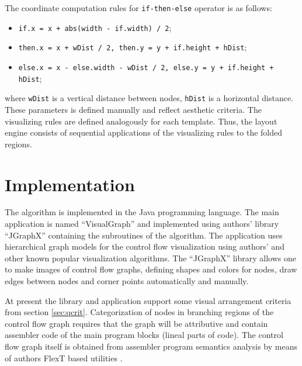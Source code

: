 \documentclass[conference]{IEEEtran}
\begin{document}
The coordinate computation rules for \texttt{if-then-else} operator is as follows:
\begin{itemize}
\item [] \texttt{if.x = x + abs(width - if.width) / 2};
\item [] \texttt{then.x = x  + wDist / 2, then.y = y + if.height + hDist};
\item [] \texttt{else.x = x - else.width - wDist / 2, else.y = y + if.height + hDist};
\end{itemize}
where \texttt{wDist} is a vertical distance between nodes, \texttt{hDist} is a horizontal distance.  These parameters is defined manually and reflect aesthetic criteria.  The visualizing rules are defined analogously for each template.  Thus, the layout engine consists of sequential applications of the visualizing rules to the folded regions.

\section{Implementation}
\label{sec:implementation}

The algorithm is implemented in the Java programming language.  The main application is named ``VisualGraph'' and implemented using authors' library ``JGraphX'' containing the subroutines of the algorithm.  The application uses hierarchical graph models for the control flow visualization using authors' and other known popular visualization algorithms.  The ``JGraphX'' library allows one to make images of control flow graphs, defining shapes and colors for nodes, draw edges between nodes and corner points automatically and manually.

At present the library and application support some visual arrangement criteria from section \ref{sec:qcrit}.  Categorization of nodes in branching regions of the control flow graph requires that the graph will be attributive and contain assembler code of the main program blocks (lineal parts of code).  The control flow graph itself is obtained from assembler program semantics analysis by means of authors FlexT based utilities \cite{flext}.

%
%
\end{document}
